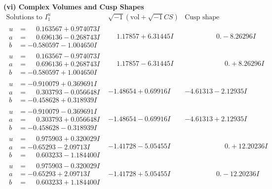 \documentclass[1p]{elsarticle_modified}
\theoremstyle{definition}
\newcommand{\I}{\sqrt{-1}}
\begin{document}
\newpage\flushleft \textbf{(vi) Complex Volumes and Cusp Shapes}
$$\begin{array}{c|c|c}  
\text{Solutions to }I^u_{1}& \I (\text{vol} + \sqrt{-1}CS) & \text{Cusp shape}\\
 \hline 
\begin{aligned}
u &= \phantom{-}0.163567 + 0.974073 I \\
a &= \phantom{-}0.696136 - 0.268743 I \\
b &= -0.580597 - 1.004650 I\end{aligned}
 & \phantom{-}1.17857 + 6.31445 I & \phantom{-0.000000 } 0. - 8.26296 I \\ \hline\begin{aligned}
u &= \phantom{-}0.163567 - 0.974073 I \\
a &= \phantom{-}0.696136 + 0.268743 I \\
b &= -0.580597 + 1.004650 I\end{aligned}
 & \phantom{-}1.17857 - 6.31445 I & \phantom{-0.000000 -}0. + 8.26296 I \\ \hline\begin{aligned}
u &= -0.910079 + 0.369691 I \\
a &= \phantom{-}0.303793 - 0.056648 I \\
b &= -0.458628 + 0.318939 I\end{aligned}
 & -1.48654 + 0.69916 I & -4.61313 - 2.12935 I \\ \hline\begin{aligned}
u &= -0.910079 - 0.369691 I \\
a &= \phantom{-}0.303793 + 0.056648 I \\
b &= -0.458628 - 0.318939 I\end{aligned}
 & -1.48654 - 0.69916 I & -4.61313 + 2.12935 I \\ \hline\begin{aligned}
u &= \phantom{-}0.975903 + 0.320029 I \\
a &= -0.65293 - 2.09713 I \\
b &= \phantom{-}0.603233 - 1.184400 I\end{aligned}
 & -1.41728 - 5.05455 I & \phantom{-0.000000 -}0. + 12.20236 I \\ \hline\begin{aligned}
u &= \phantom{-}0.975903 - 0.320029 I \\
a &= -0.65293 + 2.09713 I \\
b &= \phantom{-}0.603233 + 1.184400 I\end{aligned}
 & -1.41728 + 5.05455 I & \phantom{-0.000000 } 0. - 12.20236 I \\ \hline\begin{aligned}

\end{aligned}
\end{array}$$
\end{document}
